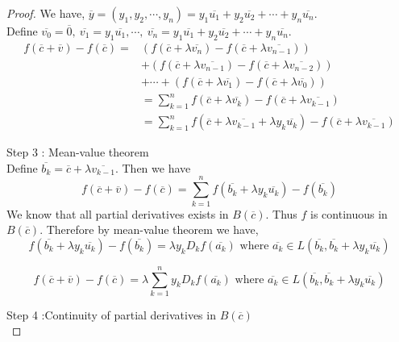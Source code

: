 \begin{proof}
	We have, $\overline{y} = (y_1, y_2, \cdots, y_n) = y_1 \overline{u_1} + y_2 \overline{u_2} + \cdots + y_n \overline{u_n}$.\\

	Define $\overline{v_0} = \overline{0},\ \overline{v_1} = y_1\overline{u_1}, \cdots, \ \overline{v_n} = y_1 \overline{u_1} + y_2 \overline{u_2} + \cdots + y_n \overline{u_n}$.
	\begin{align*}
		f(\overline{c}+\overline{v}) - f(\overline{c}) = & ( f(\overline{c}+\lambda{} \overline{v_n}) - f(\overline{c}+\lambda{} \overline{v_{n-1}}) ) \\
		& + ( f(\overline{c}+\lambda{} \overline{v_{n-1}}) - f(\overline{c}+\lambda{} \overline{v_{n-2}}) ) \\
		& + \cdots + ( f(\overline{c}+\lambda{} \overline{v_1}) - f(\overline{c}+\lambda{} \overline{v_0}) ) \\
		& = \sum_{k = 1}^n f(\overline{c} + \lambda{} \overline{v_k}) - f(\overline{c} + \lambda{} \overline{v_{k-1}}) \\
		& = \sum_{k = 1}^n f(\overline{c} + \lambda{} \overline{v_{k-1}} + \lambda{} y_k \overline{u_k}) - f(\overline{c} + \lambda{} \overline{v_{k-1}})
	\end{align*}
	\par{Step 3 :} Mean-value theorem\\
	
	Define $\overline{b_k} = \overline{c}+\lambda{}\overline{v_{k-1}}$.  Then we have
	\begin{equation}
	f(\overline{c}+\overline{v}) - f(\overline{c}) = \sum_{k = 1}^n f(\overline{b_k} + \lambda{}y_k\overline{u_k})-f(\overline{b_k})
	\end{equation}
	We know that all partial derivatives exists in $B(\overline{c})$. Thus $f$ is continuous in $B(\overline{c})$. Therefore by mean-value theorem we have,
	\[ f(\overline{b_k}+\lambda{}y_k\overline{u_k}) - f(\overline{b_k}) = \lambda{}y_kD_kf(\overline{a_k}) \text{ where } \overline{a_k} \in L(\overline{b_k},\overline{b_k}+\lambda{}y_k\overline{u_k}) \]

	\begin{equation}
		f(\overline{c}+\overline{v}) - f(\overline{c}) = \lambda{} \sum_{k = 1}^n y_kD_kf(\overline{a_k}) \text{ where } \overline{a_k} \in L(\overline{b_k},\overline{b_k}+\lambda{}y_k\overline{u_k})
	\end{equation}
	
	\par{Step 4 :}Continuity of partial derivatives in $B(\overline{c})$\\
	

\end{proof}
